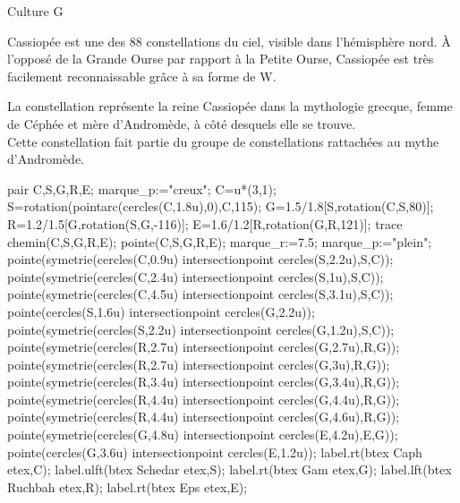 \begin{exercice*}
    \begin{changemargin}{-10mm}{-10mm}
        \begin{myBox}{ Culture G}
            \begin{flushleft}
                Cassiopée est une des 88 constellations du ciel, visible dans
                l'hémisphère nord. À l'opposé de la Grande Ourse par rapport à la 
                Petite Ourse, Cassiopée est très facilement reconnaissable grâce à 
                sa forme de \og W\fg.\par
                La constellation représente la reine Cassiopée dans la mythologie
                grecque, femme de Céphée et mère d'Andromède, à côté desquels elle se
                trouve.\\
                Cette constellation fait partie du groupe de constellations rattachées au mythe d'Andromède.
            \end{flushleft}
            {\tiny {}}
        \end{myBox}    

        \begin{Geometrie}
            pair C,S,G,R,E;
            marque_p:="creux";
            C=u*(3,1);
            S=rotation(pointarc(cercles(C,1.8u),0),C,115);
            G=1.5/1.8[S,rotation(C,S,80)];
            R=1.2/1.5[G,rotation(S,G,-116)];
            E=1.6/1.2[R,rotation(G,R,121)];
            trace chemin(C,S,G,R,E);
            pointe(C,S,G,R,E);
            marque_r:=7.5;
            marque_p:="plein";
            pointe(symetrie(cercles(C,0.9u) intersectionpoint cercles(S,2.2u),S,C));
            pointe(symetrie(cercles(C,2.4u) intersectionpoint cercles(S,1u),S,C));
            pointe(symetrie(cercles(C,4.5u) intersectionpoint cercles(S,3.1u),S,C));
            pointe(cercles(S,1.6u) intersectionpoint cercles(G,2.2u));
            pointe(symetrie(cercles(S,2.2u) intersectionpoint cercles(G,1.2u),S,C));
            pointe(symetrie(cercles(R,2.7u) intersectionpoint cercles(G,2.7u),R,G));
            pointe(symetrie(cercles(R,2.7u) intersectionpoint cercles(G,3u),R,G));
            pointe(symetrie(cercles(R,3.4u) intersectionpoint cercles(G,3.4u),R,G));
            pointe(symetrie(cercles(R,4.4u) intersectionpoint cercles(G,4.4u),R,G));
            pointe(symetrie(cercles(R,4.4u) intersectionpoint cercles(G,4.6u),R,G));
            pointe(symetrie(cercles(G,4.8u) intersectionpoint cercles(E,4.2u),E,G));
            pointe(cercles(G,3.6u) intersectionpoint cercles(E,1.2u));
            label.rt(btex Caph etex,C);
            label.ulft(btex Schedar etex,S);
            label.rt(btex Gam etex,G);
            label.lft(btex Ruchbah etex,R);
            label.rt(btex Eps etex,E);
        \end{Geometrie}
    \end{changemargin}


\end{exercice*}
